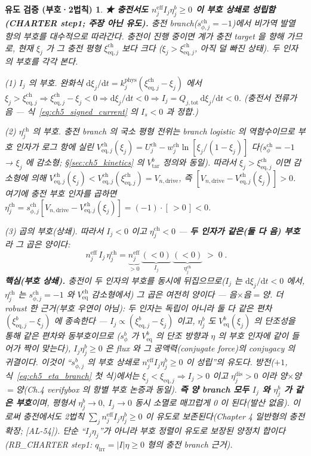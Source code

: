 \documentclass[11pt,a4paper]{article}
\newtheorem*{verifybox}{유도 검증 (부호·2법칙)}
\newcommand{\dd}{\mathrm{d}}
\newcommand{\eff}{\mathrm{eff}}
\newcommand{\eq}{\mathrm{eq}}
\newcommand{\drive}{\mathrm{drive}}
\newcommand{\tot}{\mathrm{tot}}
\newcommand{\irr}{\mathrm{irr}}
\newcommand{\dis}{\mathrm{dis}}
\newcommand{\chg}{\mathrm{ch}}
\newcommand{\tar}{\mathrm{tar}}
\newcommand{\AL}[1]{\textsf{[AL-#1]}}
\begin{document}
\begin{verifybox}
\textbf{★ 충전서도 $n_j^{\eff}I_j\eta_j^b\ge0$ 이 \emph{부호 상쇄}로 성립함 (CHARTER step1; 주장 아닌 유도).}
충전 branch($s_{\phi,j}^\chg=-1$)에서 비가역 발열 항의 부호를 \emph{대수적으로} 따라간다. 충전이 진행 중이면
계가 충전 target 을 향해 가므로, 현재 $\xi_j$ 가 그 충전 평형 $\xi_{\eq,j}^\chg$ 보다 \emph{크다}
($\xi_j>\xi_{\eq,j}^\chg$, 아직 덜 빠진 상태). 두 인자의 부호를 각각 본다.

\emph{(1) $I_j$ 의 부호.} 완화식 $\dd\xi_j/\dd t=k_j^{\mathrm{phys}}(\xi_{\eq,j}^\chg-\xi_j)$ 에서
$\xi_j>\xi_{\eq,j}^\chg\Rightarrow\xi_{\eq,j}^\chg-\xi_j<0\Rightarrow\dd\xi_j/\dd t<0\Rightarrow I_j=Q_{j,\tot}
\,\dd\xi_j/\dd t<0$. (충전서 전류가 음 — 식~\eqref{eq:ch5_signed_current} 의 $I_s<0$ 과 정합.)

\emph{(2) $\eta_j^\chg$ 의 부호.} 충전 branch 의 국소 평형 전위는 branch logistic 의 \emph{역함수}이므로 부호 인자가
로그 항에 실린 $V_{\eq,j}^\chg(\xi_j)=U_j^\chg-w_j^\chg\ln[\xi_j/(1-\xi_j)]$ 다($s_{\phi}^\chg=-1$ → $\xi_j$ 에
\emph{감소}형; \S\ref{sec:ch5_kinetics} 의 $V_{\tar}^b$ 정의와 동일). 따라서 $\xi_j>\xi_{\eq,j}^\chg$ 이면 감소형에
의해 $V_{\eq,j}^\chg(\xi_j)<V_{\eq,j}^\chg(\xi_{\eq,j}^\chg)=V_{n,\drive}$, 즉 $[V_{n,\drive}-V_{\eq,j}^\chg(\xi_j)]>0$.
여기에 충전 부호 인자를 곱하면 $\eta_j^\chg=s_{\phi,j}^\chg[V_{n,\drive}-V_{\eq,j}^\chg(\xi_j)]=(-1)\cdot[\,>0\,]<0$.

\emph{(3) 곱의 부호(상쇄).} 따라서 $I_j<0$ \emph{이고} $\eta_j^\chg<0$ — \textbf{두 인자가 \emph{같은}(둘 다
음) 부호}라 그 곱은 양이다:
\begin{equation}
\boxed{\;n_j^{\eff}\,I_j\,\eta_j^\chg=\underbrace{n_j^{\eff}}_{>0}\,\underbrace{(<0)}_{I_j}\,\underbrace{(<0)}_{\eta_j^\chg}\;>\;0\;.}
\label{eq:ch5_qirr_charge}
\end{equation}
\textbf{핵심(부호 상쇄).} 충전이 \emph{두 인자의 부호를 동시에} 뒤집으므로($I_j$ 는 $\dd\xi_j/\dd t<0$ 에서,
$\eta_j^\chg$ 는 $s_{\phi,j}^\chg=-1$ \emph{와} $V_{\eq}^\chg$ 감소형에서) 그 곱은 \emph{여전히 양}이다 — 음$\times$음$=$양.
\emph{더 robust 한 근거(부호 우연이 아님)}: 두 인자는 독립이 아니라 둘 다 같은 편차 $(\xi_{\eq,j}^b-\xi_j)$ 에 종속한다
— $I_j\propto(\xi_{\eq,j}^b-\xi_j)$ 이고, $\eta_j^b$ 도 $V_{\eq}^b(\xi_j)$ 의 단조성을 통해 같은 편차와 동부호이므로
($s_\phi^b$ 가 $V_{\eq}^b$ 의 단조 방향과 $\eta$ 의 부호 인자에 \emph{같이} 들어가 짝이 맞는다), $I_j\eta_j^b\ge0$ 은
flux 와 그 공액력(conjugate force)의 conjugacy 의 귀결이다. 이것이
``$s_{\phi,j}^b$ 의 부호 상쇄로 $n_j^{\eff}I_j\eta_j^b\ge0$ 이 성립''의 \emph{유도}다. 방전($+1$,
식~\eqref{eq:ch5_eta_branch} 첫 식)에서는 $\xi_j<\xi_{\eq,j}\Rightarrow I_j>0$ \emph{이고} $\eta_j^\dis>0$
이라 양$\times$양$=$양(Ch.4 verifybox 의 항별 부호 논증과 동일). \textbf{즉 양 branch 모두 $I_j$ 와 $\eta_j^b$
가 같은 부호}이며, 평형서 $\eta_j^b\to0,\ I_j\to0$ 동시 소멸로 매끄럽게 0 이 된다(발산 없음). 이로써
충전에서도 2법칙 $\sum_j n_j^{\eff}I_j\eta_j^b\ge0$ 이 \emph{유도}로 보존된다(Chapter 4 일반형의 충전 확장;
\AL{54}). 단순 ``$I_j\eta_j$''가 아니라 \emph{부호 정렬이 유도로 보장된} 양정치 합이다(RB\_CHARTER step1:
$q_\irr=|I|\eta\ge0$ 형의 충전 branch 근거).
\end{verifybox}
\end{document}

